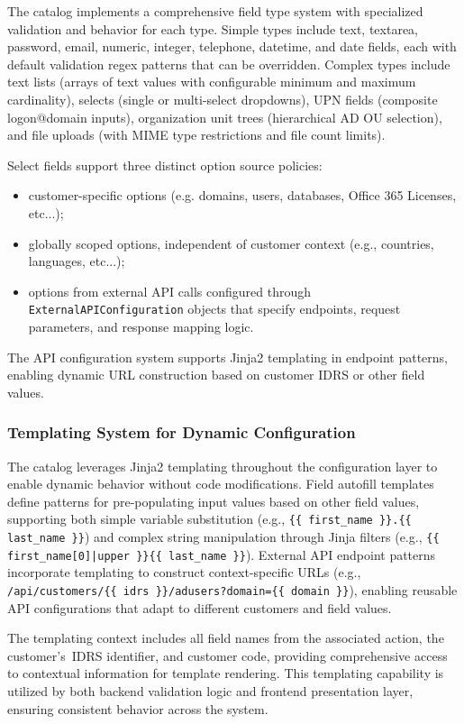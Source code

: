 The catalog implements a comprehensive field type system with specialized validation and behavior for each type. Simple types include text, textarea, password, email, numeric, integer, telephone, datetime, and date fields, each with default validation regex patterns that can be overridden. Complex types include text lists (arrays of text values with configurable minimum and maximum cardinality), selects (single or multi-select dropdowns), UPN fields (composite logon@domain inputs), organization unit trees (hierarchical AD OU selection), and file uploads (with MIME type restrictions and file count limits).

Select fields support three distinct option source policies: 
\begin{itemize}
  \item customer-specific options (e.g. domains, users, databases, Office 365 Licenses, etc...);
  \item globally scoped options, independent of customer context (e.g., countries, languages, etc...);
  \item options from external API calls configured through \texttt{ExternalAPIConfiguration} objects that specify endpoints, request parameters, and response mapping logic. 
\end{itemize}

The API configuration system supports Jinja2 templating in endpoint patterns, enabling dynamic URL construction based on customer IDRS or other field values.

\subsubsection{Templating System for Dynamic Configuration}

The catalog leverages Jinja2 templating throughout the configuration layer to enable dynamic behavior without code modifications. Field autofill templates define patterns for pre-populating input values based on other field values, supporting both simple variable substitution (e.g., \texttt{\{\{ first\_name \}\}.\{\{ last\_name \}\}}) and complex string manipulation through Jinja filters (e.g., \texttt{\{\{ first\_name[0]|upper \}\}\{\{ last\_name \}\}}). External API endpoint patterns incorporate templating to construct context-specific URLs (e.g., \texttt{/api/customers/\{\{ idrs \}\}/adusers?domain=\{\{ domain \}\}}), enabling reusable API configurations that adapt to different customers and field values.

The templating context includes all field names from the associated action, the customer's~IDRS identifier, and customer code, providing comprehensive access to contextual information for template rendering. This templating capability is utilized by both backend validation logic and frontend presentation layer, ensuring consistent behavior across the system.


